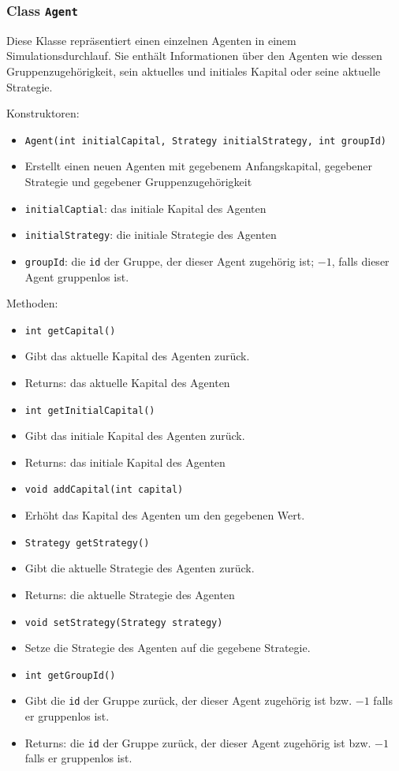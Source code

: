 \documentclass[parskip=full,11pt]{scrartcl}
\begin{document}
\subsubsection{Class \texttt{Agent}}
Diese Klasse repräsentiert einen einzelnen Agenten in einem Simulationsdurchlauf. Sie enthält Informationen über den Agenten wie dessen Gruppenzugehörigkeit, sein aktuelles und initiales Kapital oder seine aktuelle Strategie.

Konstruktoren:
\begin{itemize}\itemsep -10pt
\item \texttt{Agent(int initialCapital, Strategy initialStrategy, int groupId)}
\item[] Erstellt einen neuen Agenten mit gegebenem Anfangskapital, gegebener Strategie und gegebener Gruppenzugehörigkeit
\item[] \texttt{initialCaptial}: das initiale Kapital des Agenten
\item[] \texttt{initialStrategy}: die initiale Strategie des Agenten
\item[] \texttt{groupId}: die \texttt{id} der Gruppe, der dieser Agent zugehörig ist; \(-1\), falls dieser Agent gruppenlos ist.
\end{itemize}

Methoden:
\begin{itemize}\itemsep -10pt
\item \texttt{int getCapital()}
\item[] Gibt das aktuelle Kapital des Agenten zurück.
\item[] Returns: das aktuelle Kapital des Agenten

\item \texttt{int getInitialCapital()}
\item[] Gibt das initiale Kapital des Agenten zurück.
\item[] Returns: das initiale Kapital des Agenten

\item \texttt{void addCapital(int capital)}
\item[] Erhöht das Kapital des Agenten um den gegebenen Wert.

\item \texttt{Strategy getStrategy()}
\item[] Gibt die aktuelle Strategie des Agenten zurück.
\item[] Returns: die aktuelle Strategie des Agenten

\item\texttt{void setStrategy(Strategy strategy)}
\item[] Setze die Strategie des Agenten auf die gegebene Strategie.

\item \texttt{int getGroupId()}
\item[] Gibt die \texttt{id} der Gruppe zurück, der dieser Agent zugehörig ist bzw. \(-1\) falls er gruppenlos ist.
\item[] Returns: die \texttt{id} der Gruppe zurück, der dieser Agent zugehörig ist bzw. \(-1\) falls er gruppenlos ist.
\end{itemize}
\end{document}

